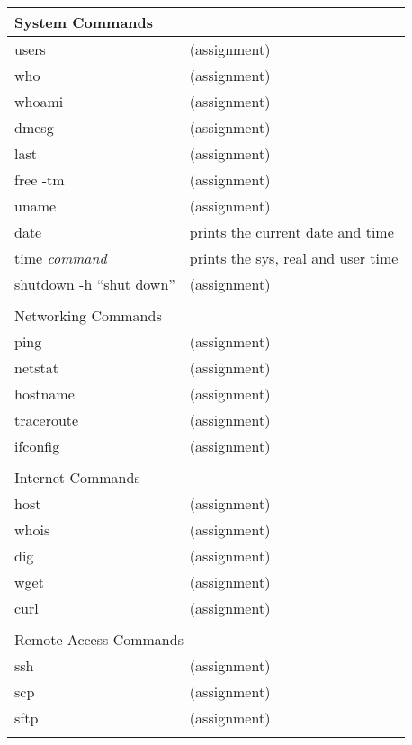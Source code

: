 \begin{center}
\begin{longtable}{|p{4cm}|p{8cm}|}
  \hline
  \multicolumn{2}{|l|}{\cellcolor{blue!15} System Commands}\\
  \hline
  users &  (assignment) \\
  who &  (assignment) \\
  whoami &  (assignment) \\
  dmesg &  (assignment) \\
  last &  (assignment) \\
  free -tm &  (assignment) \\
  uname &  (assignment) \\
  date &  prints the current date and time \\
  time \textit{command} &  prints the sys, real and user time \\
  shutdown -h ``shut down'' & (assignment) \\
  & \\

  \hline
  \multicolumn{2}{|l|}{\cellcolor{blue!15} Networking Commands}\\
  \hline
  ping &  (assignment) \\
  netstat &  (assignment) \\
  hostname &  (assignment) \\
  traceroute &  (assignment) \\
  ifconfig &  (assignment) \\
  & \\

  \hline
  \multicolumn{2}{|l|}{\cellcolor{blue!15} Internet Commands}\\
  \hline
  host &  (assignment) \\
  whois &  (assignment) \\
  dig &  (assignment) \\
  wget &  (assignment) \\
  curl &  (assignment) \\
  & \\

  \hline
  \multicolumn{2}{|l|}{\cellcolor{blue!15} Remote Access Commands}\\
  \hline
  ssh &  (assignment) \\
  scp &  (assignment) \\
  sftp &  (assignment) \\
  & \\


\end{longtable}
\end{center}

